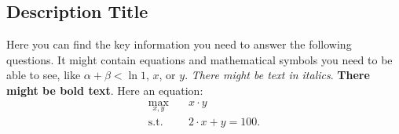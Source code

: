 \subsection*{Description Title}
Here you can find the key information you need to answer the following questions.
It might contain equations and mathematical symbols you need to be able to see, like $\alpha + \beta < \ln 1$, $x$, or $y$.
\textit{There might be text in italics}.
\textbf{There might be bold text}.
Here an equation:
\begin{equation*}
\begin{split}
  \max_{x, y}\quad&
  x\cdot y
  \\
  \text{s.t.}\quad&
  2\cdot x + y = 100
  \text{.}
\end{split}
\end{equation*}